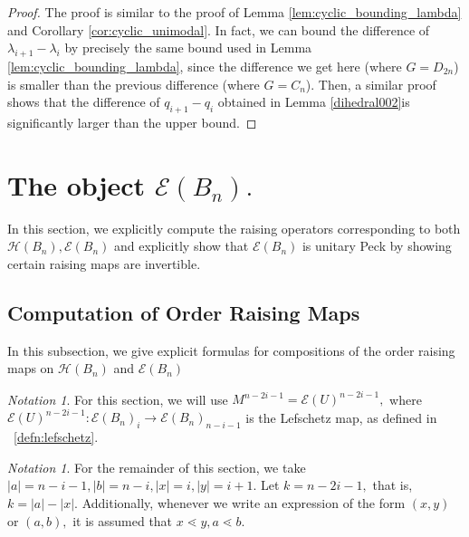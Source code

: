 \documentclass[10 pt]{amsart}
\theoremstyle{plain}
\theoremstyle{definition}
\theoremstyle{remark}
\newtheorem{note}[thm]{Notation}
\numberwithin{equation}{section}
\newcommand\ssec{\subsection}
\begin{document}
\begin{proof}
The proof is similar to the proof of Lemma \ref{lem:cyclic_bounding_lambda} and Corollary \ref{cor:cyclic_unimodal}. In fact, we can bound the difference of $\lambda_{i+1} - \lambda_i$ by precisely the same bound used in Lemma \ref{lem:cyclic_bounding_lambda}, since the difference we get here (where $G = D_{2n}$) is smaller than the previous difference (where $G= C_n$). Then, a similar proof shows that the difference of $q_{i+1} - q_i$ obtained in Lemma \ref{dihedral002}is significantly larger than the upper bound.
\end{proof}












\section{The object $\mathcal E(B_n).$}
\label{sec:unitary_peck_f}
In this section, we explicitly compute the raising operators corresponding to both \linebreak $\mathcal H(B_n),\mathcal E(B_n)$ and explicitly show that $\mathcal E(B_n)$ is unitary Peck by showing certain raising maps are invertible.

\ssec{Computation of Order Raising Maps}

In this subsection, we give explicit formulas for compositions of the order raising maps on $\mathcal H(B_n)$ and $\mathcal E(B_n)$

\begin{note}
For this section, we will use $M^{n-2i-1} = \mathcal E(U)^{n-2i-1},$ where $\mathcal E(U)^{n-2i-1}:\mathcal E(B_n)_i \rightarrow \mathcal E(B_n)_{n-i-1}$ is the Lefschetz map, as defined in ~\ref{defn:lefschetz}.
\end{note}
\begin{note}
For the remainder of this section, we take $|a| = n-i-1,|b|= n-i,|x| = i,|y| = i+1.$ Let $k = n-2i-1,$ that is, $k = |a| - |x|.$ Additionally, whenever we write an expression of the form $(x, y)$ or $(a, b),$ it is assumed that $x \lessdot y,a \lessdot b.$
\end{note}
\end{document}
